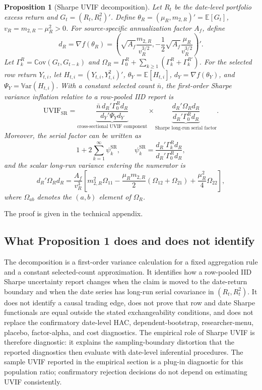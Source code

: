 \documentclass[12pt,a4paper]{article}
\newtheorem{proposition}{Proposition}
\newcommand{\E}{\mathbb{E}}
\newcommand{\Var}{\mathbb{V}\mathrm{ar}}
\newcommand{\Cov}{\mathbb{C}\mathrm{ov}}
\newcommand{\SR}{\mathrm{SR}}
\newcommand{\UVIF}{\mathrm{UVIF}}
\begin{document}
\begin{proposition}[Sharpe UVIF decomposition]
\label{prop:sharpe-uvif-decomposition}
Let \(R_t\) be the date-level portfolio excess return and
\(G_t=(R_t,R_t^2)'\).  Define
\(\theta_R=(\mu_R,m_{2,R})'=\E[G_t]\),
\(v_R=m_{2,R}-\mu_R^2>0\).  For source-specific annualization
factor \(A_f\), define
\[
  d_R=\nabla f(\theta_R)
  =
  \left(
  \sqrt{A_f}\frac{m_{2,R}}{v_R^{3/2}},
  -\frac{1}{2}\sqrt{A_f}\frac{\mu_R}{v_R^{3/2}}
  \right)' .
\]
Let \(\Gamma_k^R=\Cov(G_t,G_{t-k})\) and
\(\Omega_R=\Gamma_0^R+\sum_{k\ge1}(\Gamma_k^R+\Gamma_k^{R\prime})\).
For the selected row return \(Y_{t,i}\), let
\(H_{t,i}=(Y_{t,i},Y_{t,i}^2)'\),
\(\theta_Y=\E[H_{t,i}]\), \(d_Y=\nabla f(\theta_Y)\), and
\(\Psi_Y=\Var(H_{t,i})\).  With a constant selected count
\(\bar n\), the first-order Sharpe variance inflation relative to a
row-pooled IID report is
\begin{equation}
  \UVIF_{\SR}
  =
  \underbrace{
  \frac{\bar n\, d_R'\Gamma_0^R d_R}
       {d_Y'\Psi_Y d_Y}
  }_{\text{cross-sectional UVIF component}}
  \times
  \underbrace{
  \frac{d_R'\Omega_R d_R}
       {d_R'\Gamma_0^R d_R}
  }_{\text{Sharpe long-run serial factor}} .
  \label{eq:uvif-decomposition}
\end{equation}
Moreover, the serial factor can be written as
\[
  1+2\sum_{k=1}^{\infty}\psi_k^{\SR},
  \qquad
  \psi_k^{\SR}
  =
  \frac{d_R'\Gamma_k^R d_R}{d_R'\Gamma_0^R d_R},
\]
and the scalar long-run variance entering the numerator is
\begin{equation}
  d_R'\Omega_R d_R
  =
  \frac{A_f}{v_R^3}
  \left[
    m_{2,R}^2\Omega_{11}
    -\frac{\mu_R m_{2,R}}{2}(\Omega_{12}+\Omega_{21})
    +\frac{\mu_R^2}{4}\Omega_{22}
  \right],
  \label{eq:uvif-fourth-moment}
\end{equation}
where \(\Omega_{ab}\) denotes the \((a,b)\) element of \(\Omega_R\).
\end{proposition}

\noindent The proof is given in the technical appendix.

\subsection{What Proposition 1 does and does not identify}

The decomposition is a first-order variance calculation for a fixed
aggregation rule and a constant selected-count approximation.  It
identifies how a row-pooled IID Sharpe uncertainty report changes when
the claim is moved to the date-return boundary and when the date series
has long-run serial covariance in \((R_t,R_t^2)\).  It does not identify
a causal trading edge, does not prove that row and date Sharpe
functionals are equal outside the stated exchangeability conditions, and
does not replace the confirmatory date-level HAC, dependent-bootstrap,
researcher-menu, placebo, factor-alpha, and cost diagnostics.  The
empirical role of Sharpe UVIF is therefore diagnostic: it explains the
sampling-boundary distortion that the reported diagnostics then evaluate
with date-level inferential procedures.  The sample UVIF reported in
the empirical section is a plug-in diagnostic for this population ratio;
confirmatory rejection decisions do not depend on estimating UVIF
consistently.
\end{document}
